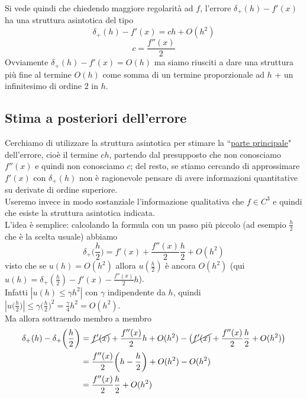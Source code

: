 Si vede quindi che chiedendo maggiore regolarità ad $f$, l'errore $\delta_+(h)-f'(x)$ ha una struttura asintotica del tipo
\begin{equation*}
    \delta_+(h)-f'(x)=ch+O(h^2)
\end{equation*}
\begin{equation*}
    c=\frac{f''(x)}{2}
\end{equation*}
Ovviamente $\delta_+(h)-f'(x)=O(h)$ ma siamo riusciti a dare una struttura più fine al termine $O(h)$ come somma di un termine proporzionale ad $h$ + un infinitesimo di ordine 2 in $h$.\\

\subsection{Stima a posteriori dell'errore}
Cerchiamo di utilizzare la struttura asintotica per stimare la ``\uline{parte principale}" dell'errore, cioè il termine $ch$, partendo dal presupposto che non conosciamo $f''(x)$ e quindi non conosciamo $c$; del resto, se stiamo cercando di approssimare $f'(x)$ con $\delta_+(h)$ non è ragionevole pensare di avere informazioni quantitative su derivate di ordine superiore.\\Useremo invece in modo
sostanziale l'informazione qualitativa che $f\in C^3$ e quindi che esiste la struttura asintotica indicata.\\L'idea è semplice: calcolando la formula con un passo più piccolo (ad esempio $\frac{h}{2}$ che è la scelta usuale) abbiamo 
\begin{equation*}
    \delta_+\biggl(\frac{h}{2}\biggr)=f'(x)+\frac{f''(x)}{2}\frac{h}{2}+O(h^2)
\end{equation*}
visto che se $u(h)=O(h^2)$ allora $u(\frac{h}{2})$ è ancora $O(h^2)$ (qui $u(h)=\delta_+(\frac{h}{2})-f'(x)-\frac{f''(x)}{2}h$).\\
Infatti $|u(h) \leq \gamma h^2|$ con $\gamma$ indipendente da $h$, quindi $|u\bigl(\frac{h}{2}\bigr)| \leq \gamma \bigl(\frac{h}{2}\bigr)^2 = \frac{\gamma}{4}h^2=O(h^2)$.\\
Ma allora sottraendo membro a membro
\begin{equation*}
    \begin{split}
        \delta_+(h)-\delta_+ \biggl(\frac{h}{2}\biggr) & = \cancel{f'(x)}+\frac{f''(x)}{2}h + O(h^2) - \bigl( \cancel{f'(x)} + \frac{f''(x)}{2}\frac{h}{2} + O(h^2) \bigr) \\
        & = \frac{f''(x)}{2}\biggl(h-\frac{h}{2}\biggr) + O(h^2) - O(h^2) \\
        & = \frac{f''(x)}{2}\frac{h}{2}+O(h^2)
    \end{split}
\end{equation*}

